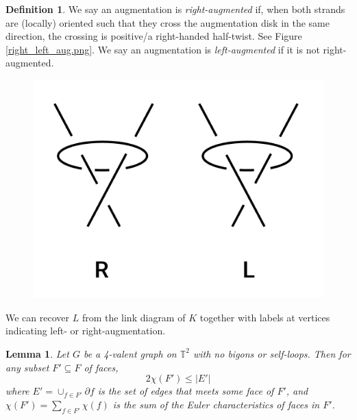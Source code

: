 \documentclass[11pt]{amsart}
\newcommand{\figref}[1]{Figure \ref{#1}}
\newcommand{\torus}{{\mathbb{T}^2}}
\newcommand{\del}{\partial}
\theoremstyle{plain}
\newtheorem{lemma}[theorem]{Lemma}
\theoremstyle{definition}
\newtheorem{define}[theorem]{Definition}
\begin{document}
\begin{define}
We say an augmentation is \emph{right-augmented} if, when both strands are
(locally) oriented such that they cross the augmentation disk in the same
direction, the crossing is positive/a right-handed half-twist.
See \figref{right_left_aug.png}.
We say an augmentation is \emph{left-augmented} if it is not right-augmented.
\begin{figure}
\label{f:right_left_aug}
\includegraphics{more_pictures/right_left_aug.png}
\end{figure}
\end{define}

We can recover $L$ from the link diagram of $K$
together with labels at vertices indicating left- or right-augmentation.


\begin{lemma}
\label{l:2fe}
Let $G$ be a 4-valent graph on $\torus$ with no bigons or self-loops.
Then for any subset $F' \subseteq F$ of faces,
\[
	2\chi(F') \leq |E'|
\]
where $E' = \cup_{f \in F'} \del f$ is the set of edges
that meets some face of $F'$,
and $\chi(F') = \sum_{f\in F'} \chi(f)$ is the sum
of the Euler characteristics of faces in $F'$.
\end{lemma}
\end{document}
